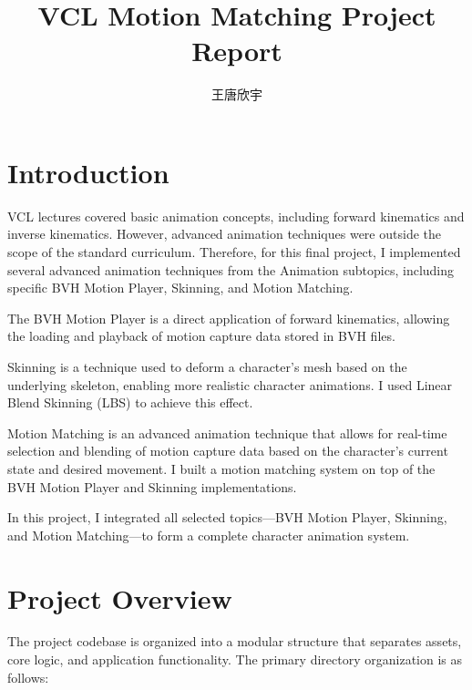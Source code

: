 \documentclass[8pt,a4paper]{extarticle}
\title{\vspace{-1cm}VCL Motion Matching Project Report}
\author{王唐欣宇}
\begin{document}
\maketitle
\thispagestyle{fancy}

\section{Introduction}
VCL lectures covered basic animation concepts, including forward kinematics and inverse kinematics. However, advanced animation techniques were outside the scope of the standard curriculum. Therefore, for this final project, I implemented several advanced animation techniques from the Animation subtopics, including specific BVH Motion Player, Skinning, and Motion Matching.

The BVH Motion Player is a direct application of forward kinematics, allowing the loading and playback of motion capture data stored in BVH files.

Skinning is a technique used to deform a character's mesh based on the underlying skeleton, enabling more realistic character animations. I used Linear Blend Skinning (LBS) to achieve this effect.

Motion Matching is an advanced animation technique that allows for real-time selection and blending of motion capture data based on the character's current state and desired movement. I built a motion matching system on top of the BVH Motion Player and Skinning implementations.

In this project, I integrated all selected topics—BVH Motion Player, Skinning, and Motion Matching—to form a complete character animation system.

\section{Project Overview}
The project codebase is organized into a modular structure that separates assets, core logic, and application functionality. The primary directory organization is as follows:
\end{document}
